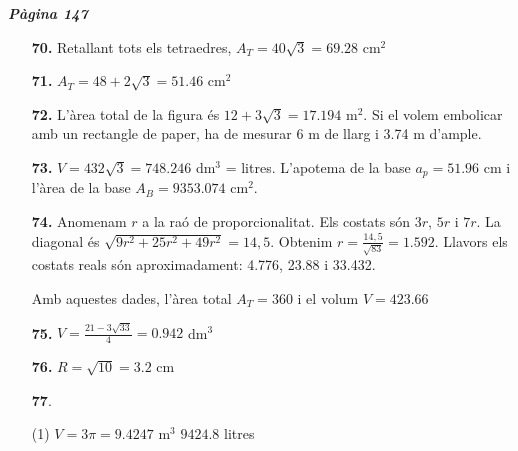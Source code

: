 \documentclass[a4paper, pdf, twoside]{book}
\begin{document}
\begin{multicols}{2}
{\textbf{\em Pàgina 147}} \hrulefill
\begin{enumerate}
\vspace{0.25cm}
\item[\fontfamily{phv}\selectfont\color{blue}\textbf{70. }] 
Retallant tots els tetraedres, $A_T=40\sqrt {3}=69.28$ cm$^2$
 \end{enumerate}
\begin{enumerate}
\vspace{0.25cm}
\item[\fontfamily{phv}\selectfont\color{blue}\textbf{71. }] 
$A_T=48+2\sqrt {3}=51.46$ cm$^2$
\vspace{0.25cm}
\item[\fontfamily{phv}\selectfont\color{blue}\textbf{72. }] 
L'àrea total de la figura és $12+3\sqrt {3}=17.194$ m$^2$. Si el volem embolicar amb un rectangle de paper, ha de mesurar 6 m de llarg i 3.74 m d'ample. 
\vspace{0.25cm}
\item[\fontfamily{phv}\selectfont\color{blue}\textbf{73. }] 
$V=432\sqrt {3}=748.246$ dm$^3$ = litres. L'apotema de la base $a_p=51.96$ cm i l'àrea de la base $A_B=9353.074$ cm$^2$.
\vspace{0.25cm}
\item[\fontfamily{phv}\selectfont\color{blue}\textbf{74. }] 
Anomenam $r$ a la raó de proporcionalitat. Els costats són $3r$, $5r$ i $7r$. La diagonal és $\sqrt {9r^2+25r^2+49r^2}=14,5$. Obtenim $r=\frac {14,5}{\sqrt {83}}=1.592$. Llavors els costats reals són aproximadament: 4.776, 23.88 i 33.432. \par Amb aquestes dades, l'àrea total $A_T=360$ i el volum $V=423.66$
\vspace{0.25cm}
\item[\fontfamily{phv}\selectfont\color{blue}\textbf{75. }] 
$V=\frac {21-3\sqrt {33}}{4}=0.942$ dm$^3$
\vspace{0.25cm}
\item[\fontfamily{phv}\selectfont\color{blue}\textbf{76. }] 
$R=\sqrt {10}=3.2$ cm
\vspace{0.25cm}



 \item[\fontfamily{phv}\selectfont\color{blue}\textbf{77}. ] 
 \begin{tasks}[column-sep=1em, item-indent=1.3333em](1)
	 \task $V=3\pi =9.4247$ m$^3$
	 \task $9424.8$ litres
\end{tasks}
\vspace{0.25cm}



\end{enumerate}
\end{multicols}
\end{document}
